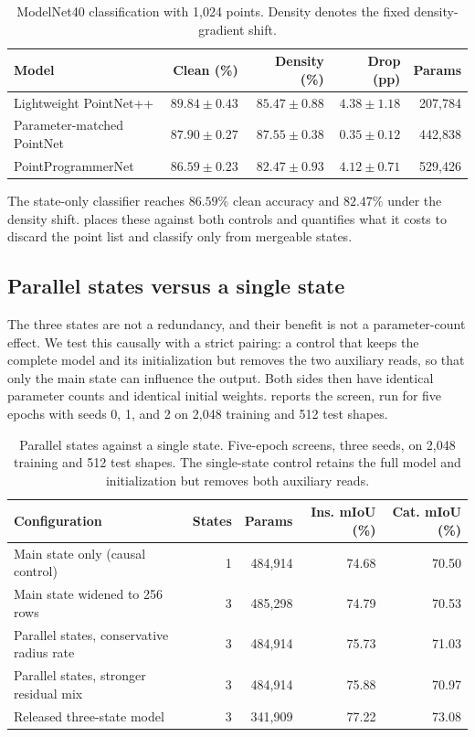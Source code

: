 \documentclass[11pt,a4paper]{article}
\begin{document}
\begin{table}[t]
\centering
\caption{ModelNet40 classification with 1,024 points. Density denotes the fixed density-gradient shift.}
\label{tab:classification_accuracy}
\begin{tabular}{lrrrr}
\toprule
Model & Clean (\%) & Density (\%) & Drop (pp) & Params \\
\midrule
Lightweight PointNet++ & $89.84\pm0.43$ & $85.47\pm0.88$ & $4.38\pm1.18$ & 207,784 \\
Parameter-matched PointNet & $87.90\pm0.27$ & $87.55\pm0.38$ & $0.35\pm0.12$ & 442,838 \\
PointProgrammerNet & $86.59\pm0.23$ & $82.47\pm0.93$ & $4.12\pm0.71$ & 529,426 \\
\bottomrule
\end{tabular}
\end{table}
The state-only classifier reaches $86.59\%$ clean accuracy and $82.47\%$ under the density shift.  places these against both controls and quantifies what it costs to discard the point list and classify only from mergeable states.

\subsection{Parallel states versus a single state}
\label{sec:parallel}
The three states are not a redundancy, and their benefit is not a parameter-count effect. We test this causally with a strict pairing: a control that keeps the complete model and its initialization but removes the two auxiliary reads, so that only the main state can influence the output. Both sides then have identical parameter counts and identical initial weights.  reports the screen, run for five epochs with seeds 0, 1, and 2 on 2,048 training and 512 test shapes.

\begin{table}[t]
\centering
\caption{Parallel states against a single state. Five-epoch screens, three seeds, on 2,048 training and 512 test shapes. The single-state control retains the full model and initialization but removes both auxiliary reads.}
\label{tab:parallel_states}
\begin{tabular}{lrrrr}
\toprule
Configuration & States & Params & Ins. mIoU (\%) & Cat. mIoU (\%) \\
\midrule
Main state only (causal control) & 1 & 484,914 & 74.68 & 70.50 \\
Main state widened to 256 rows & 3 & 485,298 & 74.79 & 70.53 \\
Parallel states, conservative radius rate & 3 & 484,914 & 75.73 & 71.03 \\
Parallel states, stronger residual mix & 3 & 484,914 & 75.88 & 70.97 \\
\midrule
Released three-state model & 3 & 341,909 & 77.22 & 73.08 \\
\bottomrule
\end{tabular}
\end{table}
\end{document}
